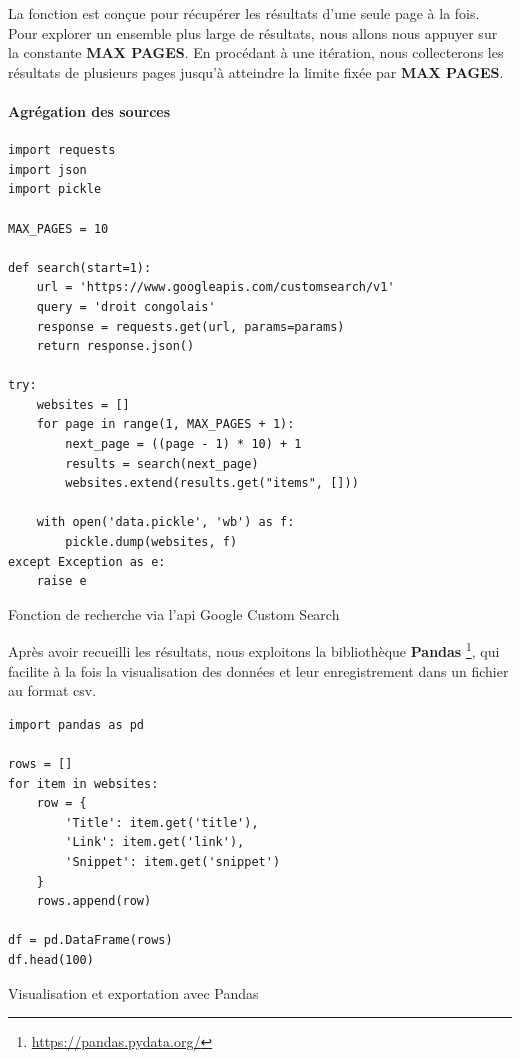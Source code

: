 La fonction est conçue pour récupérer les résultats d'une seule page à la fois. Pour explorer un ensemble plus large de résultats, nous allons nous appuyer sur la constante \textbf{MAX PAGES}. En procédant à une itération, nous collecterons les résultats de plusieurs pages jusqu'à atteindre la limite fixée par \textbf{MAX PAGES}.

\paragraph{Agrégation des sources} \hspace{0pt}

\begin{listing}[!ht]
\begin{verbatim}
import requests
import json
import pickle

MAX_PAGES = 10

def search(start=1):
    url = 'https://www.googleapis.com/customsearch/v1'
    query = 'droit congolais'
    response = requests.get(url, params=params)
    return response.json()

try:
    websites = []
    for page in range(1, MAX_PAGES + 1):
        next_page = ((page - 1) * 10) + 1
        results = search(next_page)
        websites.extend(results.get("items", []))

    with open('data.pickle', 'wb') as f:
        pickle.dump(websites, f)
except Exception as e:
    raise e
\end{verbatim}
\caption{Fonction de recherche via l'\acs{api} Google Custom Search}
\label{appendix:code:python:search-google-function}
\end{listing}

Après avoir recueilli les résultats, nous exploitons la bibliothèque \textbf{Pandas} \footnote{\href{https://pandas.pydata.org/}{https://pandas.pydata.org/}}, qui facilite à la fois la visualisation des données et leur enregistrement dans un fichier au format \acs{csv}.

\begin{listing}[!ht]
\begin{verbatim}
import pandas as pd 

rows = []
for item in websites:
    row = {
        'Title': item.get('title'),
        'Link': item.get('link'),
        'Snippet': item.get('snippet')
    }
    rows.append(row)

df = pd.DataFrame(rows)
df.head(100)
\end{verbatim}
\caption{Visualisation et exportation avec Pandas}
\label{appendix:code:python:search-google-visualization}
\end{listing}



